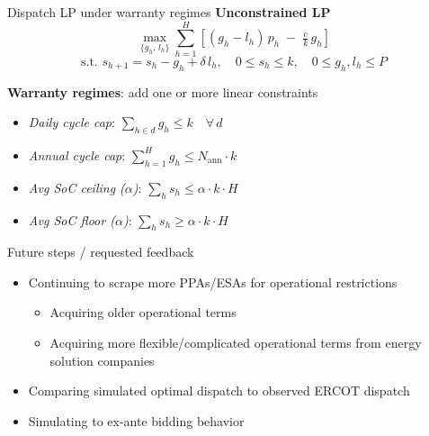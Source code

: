 \documentclass[aspectratio=169]{beamer}
\begin{document}
\begin{frame}{Dispatch LP under warranty regimes}
\textbf{Unconstrained LP}
\[
\max_{\{g_h,\, l_h\}} \sum_{h=1}^{H} \left[(g_h - l_h)\,p_h \;-\; \tfrac{c}{k}\,g_h\right]
\]
\[
\text{s.t. } s_{h+1} = s_h - g_h + \delta\, l_h,\quad 0 \leq s_h \leq k,\quad 0 \leq g_h, l_h \leq P
\]

\vspace{0.1cm}
\textbf{Warranty regimes}: add one or more linear constraints
\begin{itemize}
    \item \textit{Daily cycle cap}: $\sum_{h \in d} g_h \leq k \quad \forall\,d$
    \item \textit{Annual cycle cap}: $\sum_{h=1}^{H} g_h \leq N_{\text{ann}} \cdot k$
    \item \textit{Avg SoC ceiling ($\alpha$)}: $\sum_{h} s_h \leq \alpha \cdot k \cdot H$
    \item \textit{Avg SoC floor ($\alpha$)}: $\sum_{h} s_h \geq \alpha \cdot k \cdot H$
\end{itemize}

\end{frame}

\begin{frame}{Future steps / requested feedback}
    \begin{itemize}
        \item Continuing to scrape more PPAs/ESAs for operational restrictions
        \begin{itemize}
            \item Acquiring older operational terms
            \item Acquiring more flexible/complicated operational terms from energy solution companies
        \end{itemize}
        \item Comparing simulated optimal dispatch to observed ERCOT dispatch
        \item Simulating to ex-ante bidding behavior
    \end{itemize}
\end{frame}
\end{document}
